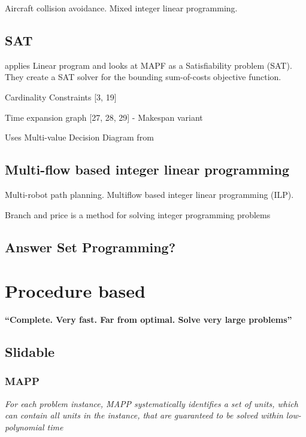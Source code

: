 \documentclass[a4paper,11pt]{article}
\begin{document}
\cite{richards2002aircraft} Aircraft collision avoidance. Mixed integer linear programming.

\subsection{SAT}
\cite{surynek2016efficient} applies Linear program and looks at MAPF as a Satisfiability problem (SAT). They create a SAT solver for the bounding sum-of-costs objective function.


\begin{compactitem}
	\item Cardinality Constraints [3, 19]
	\item Time expansion graph [27, 28, 29] - Makespan variant
	\item Uses Multi-value Decision Diagram from \cite{sharon2011increasing}
\end{compactitem}


\subsection{Multi-flow based integer linear programming}

\cite{yu2013planning} Multi-robot path planning. Multiflow based integer linear programming (ILP).

Branch and price is a method for solving integer programming problems





\subsection{Answer Set Programming?}

\section{Procedure based}

\textbf{``Complete. Very fast. Far from optimal. Solve very large problems''}

\subsection{Slidable}
\subsubsection*{MAPP}
\cite{wang2011mapp}

\textit{For each problem instance, MAPP systematically identifies a set of units, which can contain all units in the instance, that are guaranteed to be solved within low-polynomial time} \\
\end{document}
